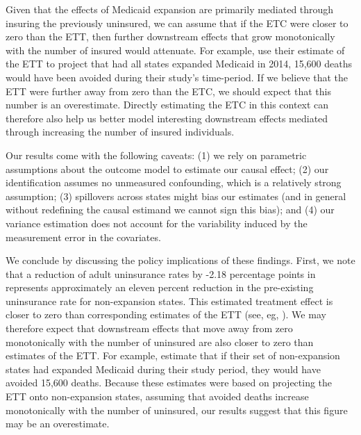 \documentclass[12pt]{article}
\begin{document}
Given that the effects of Medicaid expansion are primarily mediated through insuring the previously uninsured, we can assume that if the ETC were closer to zero than the ETT, then further downstream effects that grow monotonically with the number of insured would attenuate. For example, \cite{miller2019medicaid} use their estimate of the ETT to project that had all states expanded Medicaid in 2014, 15,600 deaths would have been avoided during their study's time-period. If we believe that the ETT were further away from zero than the ETC, we should expect that this number is an overestimate. Directly estimating the ETC in this context can therefore also help us better model interesting downstream effects mediated through increasing the number of insured individuals.

Our results come with the following caveats: (1) we rely on parametric assumptions about the outcome model to estimate our causal effect; (2) our identification assumes no unmeasured confounding, which is a relatively strong assumption; (3) spillovers across states might bias our estimates (and in general without redefining the causal estimand we cannot sign this bias); and (4) our variance estimation does not account for the variability induced by the measurement error in the covariates. 

We conclude by discussing the policy implications of these findings. First, we note that a reduction of adult uninsurance rates by -2.18 percentage points in represents approximately an eleven percent reduction in the pre-existing uninsurance rate for non-expansion states. This estimated treatment effect is closer to zero than corresponding estimates of the ETT (see, eg, \cite{courtemanche2017early}). We may therefore expect that downstream effects that move away from zero monotonically with the number of uninsured are also closer to zero than estimates of the ETT. For example, \cite{miller2019medicaid} estimate that if their set of non-expansion states had expanded Medicaid during their study period, they would have avoided 15,600 deaths. Because these estimates were based on projecting the ETT onto non-expansion states, assuming that avoided deaths increase monotonically with the number of uninsured, our results suggest that this figure may be an overestimate.
\end{document}
